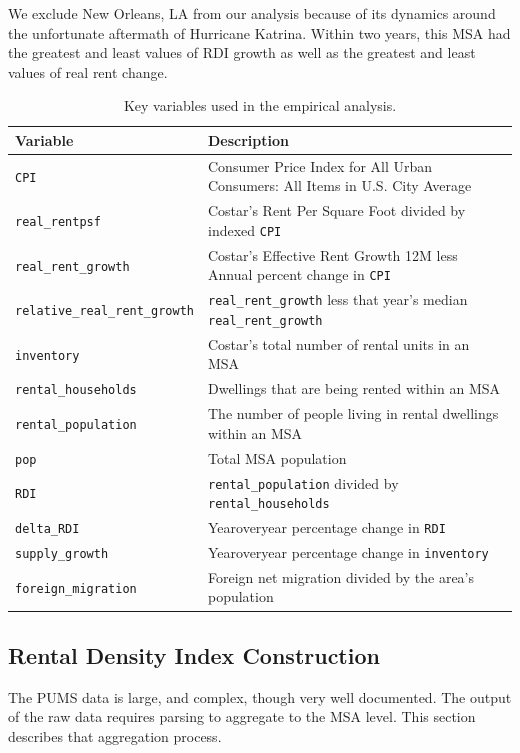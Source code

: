 \documentclass[APA,Times1COL]{WileyNJDv5} %
\begin{document}
We exclude New Orleans, LA from our analysis because of its dynamics around the unfortunate aftermath of Hurricane Katrina. Within two years, this MSA had the greatest and least values of RDI growth as well as the greatest and least values of real rent change. 

\begin{table}[hbt]%
\centering
\caption{Key variables used in the empirical analysis.\label{tab:variables}}%
\begin{tabular*}{\textwidth}{@{\extracolsep\fill}ll@{\extracolsep\fill}}%
\toprule
\textbf{Variable} & \textbf{Description} \\
\midrule
\texttt{CPI}					& Consumer Price Index for All Urban Consumers: All Items in U.S. City Average \\
\texttt{real\_rentpsf}               & Costar's Rent Per Square Foot divided by indexed \texttt{CPI}\\
\texttt{real\_rent\_growth}          & Costar's Effective Rent Growth 12M less Annual percent change in \texttt{CPI} \\
\texttt{relative\_real\_rent\_growth}          & \texttt{real\_rent\_growth} less that year's median \texttt{real\_rent\_growth}\\
\texttt{inventory}					& Costar's total number of rental units in an MSA \\
\texttt{rental\_households}             & Dwellings that are being rented within an MSA\\
\texttt{rental\_population}		& The number of people living in rental dwellings within an MSA\\
\texttt{pop}                   & Total MSA population  \\
\texttt{RDI}			       & \texttt{rental\_population} divided by \texttt{rental\_households} \\
\texttt{delta\_RDI}	           & Yearoveryear percentage change in \texttt{RDI} \\
\texttt{supply\_growth}        & Yearoveryear percentage change in \texttt{inventory} \\
\texttt{foreign\_migration}     & Foreign net migration divided by the area's population \\
\bottomrule
\end{tabular*}
\end{table}

\subsection*{Rental Density Index Construction}
The PUMS data is large, and complex, though very well documented. The output of the raw data requires parsing to aggregate to the MSA level. This section describes that aggregation process.
\end{document}
